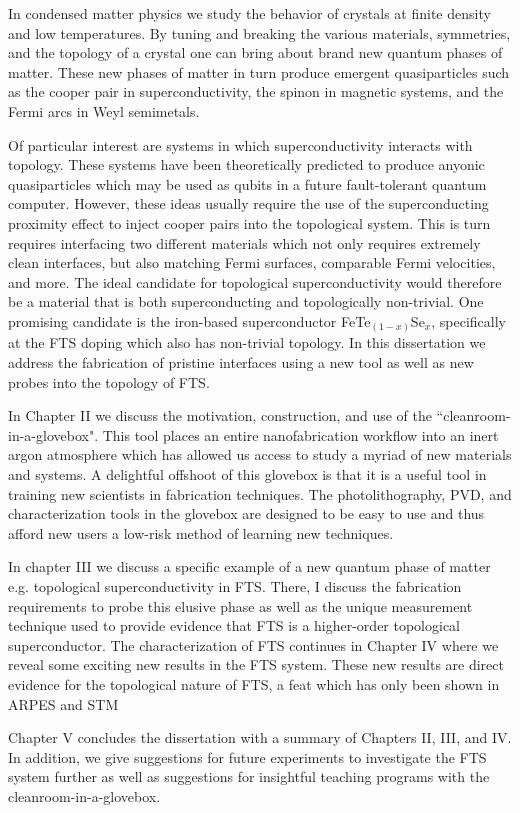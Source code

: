 \thispagestyle{empty}
In condensed matter physics we study the behavior of crystals at finite density and low temperatures. By tuning and breaking the various materials, symmetries, and the topology of a crystal one can bring about brand new quantum phases of matter. These new phases of matter in turn produce emergent quasiparticles such as the cooper pair in superconductivity, the spinon in magnetic systems, and the Fermi arcs in Weyl semimetals. \par
Of particular interest are systems in which superconductivity interacts with topology. These systems have been theoretically predicted to produce anyonic quasiparticles which may be used as qubits in a future fault-tolerant quantum computer. However, these ideas usually require the use of the superconducting proximity effect to inject cooper pairs into the topological system. This is turn requires interfacing two different materials which not only requires extremely clean interfaces, but also matching Fermi surfaces, comparable Fermi velocities, and more. The ideal candidate for topological superconductivity would therefore be a material that is both superconducting and topologically non-trivial. One promising candidate is the iron-based superconductor FeTe$_{(1-x)}$Se$_{x}$, specifically at the \ac{FTS} doping  which also has non-trivial topology. In this dissertation we address the fabrication of pristine interfaces using a new tool as well as new probes into the topology of \ac{FTS}.\par
In Chapter II we discuss the motivation, construction, and use of the ``cleanroom-in-a-glovebox". 
This tool places an entire nanofabrication workflow into an inert argon atmosphere which has allowed us access to study a myriad of new materials and systems. A delightful offshoot of this glovebox is that it is a useful tool in training new scientists in fabrication techniques. The photolithography, \ac{PVD}, and characterization tools in the glovebox are designed to be easy to use and thus afford new users a low-risk method of learning new techniques.\par
In chapter III we discuss a specific example of a new quantum phase of matter e.g. topological superconductivity in FTS. There, I discuss the fabrication requirements to probe this elusive phase as well as the unique measurement technique used to provide evidence that FTS is a higher-order topological superconductor. The characterization of FTS continues in Chapter IV where we reveal some exciting new results in the \ac{FTS} system. These new results are direct evidence for the topological nature of \ac{FTS}, a feat which has only been shown in \ac{ARPES} and \ac{STM}\par
Chapter V concludes the dissertation with a summary of Chapters II, III, and IV. In addition, we give suggestions for future experiments to investigate the FTS system further as well as suggestions for insightful teaching programs with the cleanroom-in-a-glovebox.\thispagestyle{empty}